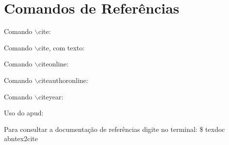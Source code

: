 {\color{red}
\section{Comandos de Referências}


Comando $\backslash$cite:

\cite{NBR6024:2012}

\vspace{0.5cm}


Comando $\backslash$cite, com texto: 

\cite[p. 15]{NBR14724:2011}

\vspace{0.5cm}



Comando $\backslash$citeonline:


\vspace{0.5cm}



Comando $\backslash$citeauthoronline:


\vspace{0.5cm}


Comando $\backslash$citeyear: 

\citeyear{GIL}

\vspace{0.5cm}



Uso do apud:


\vspace{0.5cm}


\cite{BU}

\vspace{0.5cm}

Para consultar a documentação de referências digite no terminal: \$ texdoc abntex2cite
}